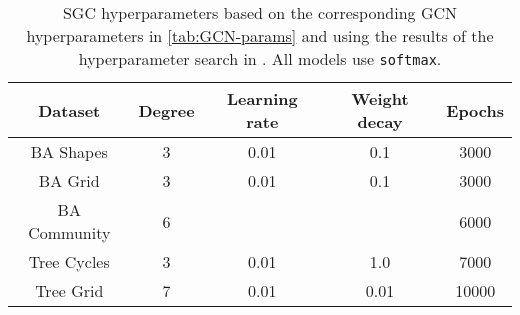 \begin{table}
    \centering
    \begin{tabular}{c|cccc}
        \textbf{Dataset} &
        \textbf{Degree} &
        \textbf{Learning rate} &
        \textbf{Weight decay} &
        \textbf{Epochs} \\
        \midrule
        BA Shapes       & 3 & 0.01 & 0.1 & 3000 \\
        BA Grid         & 3 & 0.01 & 0.1 & 3000 \\
        BA Community    & 6 & & & 6000 \\
        Tree Cycles     & 3 & 0.01 & 1.0 & 7000 \\
        Tree Grid       & 7 & 0.01 & 0.01 & 10000 \\
    \end{tabular}
    \caption{SGC hyperparameters based on the corresponding GCN hyperparameters in \ref{tab:GCN-params} and using the results of the hyperparameter search in . All models use \texttt{softmax}.}
    \label{tab:SGC-params}
\end{table}

